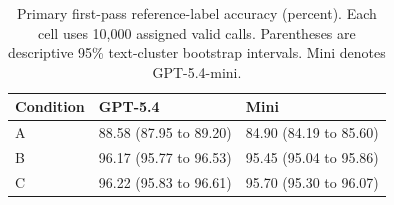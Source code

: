 \begin{table}[htbp]\centering\small
\caption{Primary first-pass reference-label accuracy (percent). Each cell uses 10,000 assigned valid calls. Parentheses are descriptive 95\% text-cluster bootstrap intervals. Mini denotes GPT-5.4-mini.}\label{tab:accuracy}
\begin{tabularx}{\linewidth}{lXX}\toprule
Condition & GPT-5.4 & Mini \\\midrule
A & 88.58 (87.95 to 89.20) & 84.90 (84.19 to 85.60) \\
B & 96.17 (95.77 to 96.53) & 95.45 (95.04 to 95.86) \\
C & 96.22 (95.83 to 96.61) & 95.70 (95.30 to 96.07) \\
\bottomrule
\end{tabularx}
\end{table}